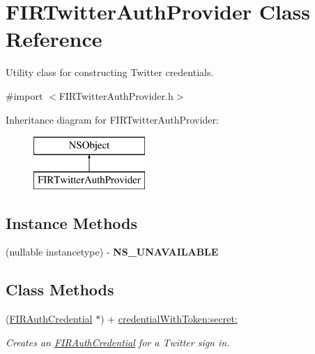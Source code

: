 \hypertarget{interface_f_i_r_twitter_auth_provider}{}\section{F\+I\+R\+Twitter\+Auth\+Provider Class Reference}
\label{interface_f_i_r_twitter_auth_provider}


Utility class for constructing Twitter credentials.  




{\ttfamily \#import $<$F\+I\+R\+Twitter\+Auth\+Provider.\+h$>$}

Inheritance diagram for F\+I\+R\+Twitter\+Auth\+Provider\+:\begin{figure}[H]
\begin{center}
\leavevmode
\includegraphics[height=2.000000cm]{interface_f_i_r_twitter_auth_provider}
\end{center}
\end{figure}
\subsection*{Instance Methods}
\begin{DoxyCompactItemize}
\item 
\hypertarget{interface_f_i_r_twitter_auth_provider_a7b005af96634494b93fe2b27aaa79bac}{}(nullable instancetype) -\/ {\bfseries N\+S\+\_\+\+U\+N\+A\+V\+A\+I\+L\+A\+B\+L\+E}\label{interface_f_i_r_twitter_auth_provider_a7b005af96634494b93fe2b27aaa79bac}

\end{DoxyCompactItemize}
\subsection*{Class Methods}
\begin{DoxyCompactItemize}
\item 
(\hyperlink{interface_f_i_r_auth_credential}{F\+I\+R\+Auth\+Credential} $\ast$) + \hyperlink{interface_f_i_r_twitter_auth_provider_a6d3810d25675677d388a85218f7afa5a}{credential\+With\+Token\+:secret\+:}
\begin{DoxyCompactList}\small\item\em Creates an {\ttfamily \hyperlink{interface_f_i_r_auth_credential}{F\+I\+R\+Auth\+Credential}} for a Twitter sign in. \end{DoxyCompactList}\end{DoxyCompactItemize}


